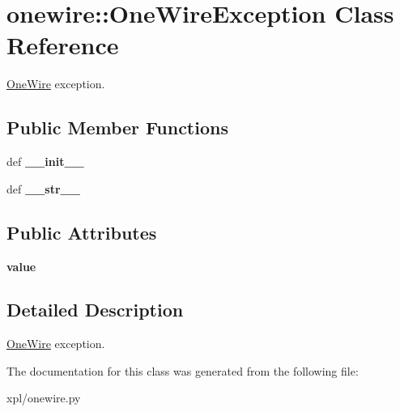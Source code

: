 \hypertarget{classonewire_1_1OneWireException}{
\section{onewire::OneWireException Class Reference}
\label{classonewire_1_1OneWireException}
}
\hyperlink{classonewire_1_1OneWire}{OneWire} exception.  


\subsection*{Public Member Functions}
\begin{CompactItemize}
\item 
\hypertarget{classonewire_1_1OneWireException_e19dc9d7c1ad8e838679a1670ec20802}{
def \textbf{\_\-\_\-init\_\-\_\-}}
\label{classonewire_1_1OneWireException_e19dc9d7c1ad8e838679a1670ec20802}

\item 
\hypertarget{classonewire_1_1OneWireException_b97f5138487e792bca2b75f392cdd70d}{
def \textbf{\_\-\_\-str\_\-\_\-}}
\label{classonewire_1_1OneWireException_b97f5138487e792bca2b75f392cdd70d}

\end{CompactItemize}
\subsection*{Public Attributes}
\begin{CompactItemize}
\item 
\hypertarget{classonewire_1_1OneWireException_4e217e555112a6ddf7b601637a835571}{
\textbf{value}}
\label{classonewire_1_1OneWireException_4e217e555112a6ddf7b601637a835571}

\end{CompactItemize}


\subsection{Detailed Description}
\hyperlink{classonewire_1_1OneWire}{OneWire} exception. 

The documentation for this class was generated from the following file:\begin{CompactItemize}
\item 
xpl/onewire.py\end{CompactItemize}

